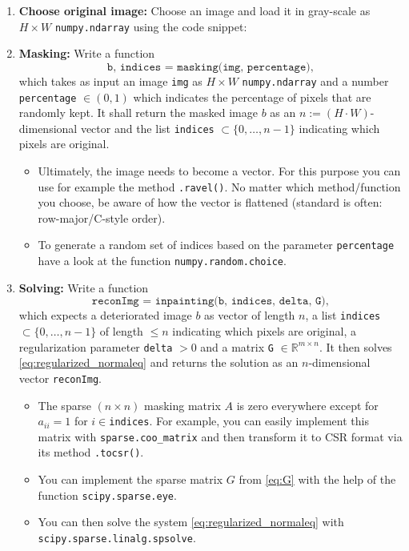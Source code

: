 \begin{enumerate}
	\item \textbf{Choose original image:} Choose an image and load it in gray-scale as $H\times W$ \texttt{numpy.ndarray} using the code snippet:
	
	\item \textbf{Masking:} Write a function 
	$$\texttt{b, indices = masking(img, percentage)},$$
	which takes as input an image \texttt{img} as $H\times W$ \texttt{numpy.ndarray} and a number \texttt{percentage} $\in (0,1)$ which indicates the percentage of pixels that are randomly kept. It shall return the masked image $b$ as an $n:=(H\cdot W)$-dimensional vector and the list \texttt{indices} $\subset \{0,\ldots, n-1\}$ indicating which pixels are original.
	\begin{itemize}
		\item Ultimately, the image needs to become a vector. For this purpose you can use for example the method \texttt{.ravel()}. No matter which method/function you choose, be aware of how the vector is flattened (standard is often: row-major/C-style order).
		\item To generate a random set of indices based on the parameter \texttt{percentage} have a look at the function \texttt{numpy.random.choice}.
	\end{itemize}
	\item \textbf{Solving:} Write a function 
	 $$\texttt{reconImg = inpainting(b, indices, delta, G)},$$
	 which expects a deteriorated image $b$ as vector of length $n$, a list \texttt{indices} $\subset \{0,\ldots, n-1\}$ of length $\leq n$ indicating which pixels are original, a regularization parameter \texttt{delta} $>0$ and a matrix \texttt{G} $\in \mathbb{R}^{m\times n}$. It then solves \eqref{eq:regularized_normaleq} and returns the solution as an $n$-dimensional vector \texttt{reconImg}.
	 \begin{itemize}
	 	\item The sparse  $(n \times n)$ masking matrix $A$ is zero everywhere except for $a_{ii} = 1$ for $i \in$\texttt{indices}. For example, you can easily implement this matrix with  \texttt{sparse.coo\_matrix} and then transform it to CSR format via its method \texttt{.tocsr()}.
	 	\item You can implement the sparse matrix $G$ from \eqref{eq:G} with the help of the function \texttt{scipy.sparse.eye}.
	 	\item You can then solve the system \eqref{eq:regularized_normaleq} with \texttt{scipy.sparse.linalg.spsolve}.

\end{itemize}
\end{enumerate}
